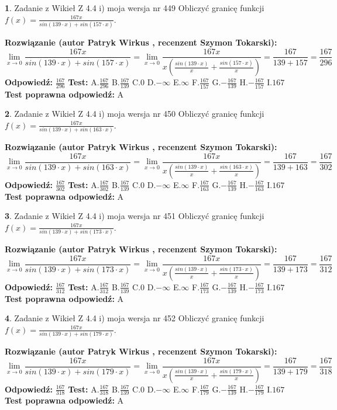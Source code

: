 \documentclass[12pt, a4paper]{article}
\theoremstyle{definition} %
\newtheorem{zad}{}
\newcommand{\zadStart}[1]{\begin{zad}#1\newline}
\newcommand{\zadStop}{\end{zad}}
\newcommand{\rozwStart}[2]{\noindent \textbf{Rozwiązanie (autor #1 , recenzent #2): }\newline}
\newcommand{\rozwStop}{\newline}
\newcommand{\odpStart}{\noindent \textbf{Odpowiedź:}\newline}
\newcommand{\odpStop}{\newline}
\newcommand{\testStart}{\noindent \textbf{Test:}\newline}
\newcommand{\testStop}{\newline}
\newcommand{\kluczStart}{\noindent \textbf{Test poprawna odpowiedź:}\newline}
\newcommand{\kluczStop}{\newline}
\begin{document}
\zadStart{Zadanie z Wikieł Z 4.4 i) moja wersja nr 449}
Obliczyć granicę funkcji $f(x)=\frac{167x}{sin(139\cdot x) +sin(157\cdot x)}$.
\zadStop
\rozwStart{Patryk Wirkus}{Szymon Tokarski}
$$\lim\limits_{x\to 0}\frac{167x}{sin(139\cdot x) +sin(157\cdot x)}=\lim\limits_{x\to 0}\frac{167x}{x(\frac{sin(139\cdot x)}{x}+\frac{sin(157\cdot x)}{x})}=\frac{167}{139+157} = \frac{167}{296}$$
\rozwStop
\odpStart
$\frac{167}{296}$
\odpStop
\testStart
A.$\frac{167}{296}$
B.$\frac{167}{139}$
C.$0$
D.$-\infty$
E.$\infty$
F.$\frac{167}{157}$
G.$-\frac{167}{139}$
H.$-\frac{167}{157}$
I.$167$
\testStop
\kluczStart
A
\kluczStop



\zadStart{Zadanie z Wikieł Z 4.4 i) moja wersja nr 450}
Obliczyć granicę funkcji $f(x)=\frac{167x}{sin(139\cdot x) +sin(163\cdot x)}$.
\zadStop
\rozwStart{Patryk Wirkus}{Szymon Tokarski}
$$\lim\limits_{x\to 0}\frac{167x}{sin(139\cdot x) +sin(163\cdot x)}=\lim\limits_{x\to 0}\frac{167x}{x(\frac{sin(139\cdot x)}{x}+\frac{sin(163\cdot x)}{x})}=\frac{167}{139+163} = \frac{167}{302}$$
\rozwStop
\odpStart
$\frac{167}{302}$
\odpStop
\testStart
A.$\frac{167}{302}$
B.$\frac{167}{139}$
C.$0$
D.$-\infty$
E.$\infty$
F.$\frac{167}{163}$
G.$-\frac{167}{139}$
H.$-\frac{167}{163}$
I.$167$
\testStop
\kluczStart
A
\kluczStop



\zadStart{Zadanie z Wikieł Z 4.4 i) moja wersja nr 451}
Obliczyć granicę funkcji $f(x)=\frac{167x}{sin(139\cdot x) +sin(173\cdot x)}$.
\zadStop
\rozwStart{Patryk Wirkus}{Szymon Tokarski}
$$\lim\limits_{x\to 0}\frac{167x}{sin(139\cdot x) +sin(173\cdot x)}=\lim\limits_{x\to 0}\frac{167x}{x(\frac{sin(139\cdot x)}{x}+\frac{sin(173\cdot x)}{x})}=\frac{167}{139+173} = \frac{167}{312}$$
\rozwStop
\odpStart
$\frac{167}{312}$
\odpStop
\testStart
A.$\frac{167}{312}$
B.$\frac{167}{139}$
C.$0$
D.$-\infty$
E.$\infty$
F.$\frac{167}{173}$
G.$-\frac{167}{139}$
H.$-\frac{167}{173}$
I.$167$
\testStop
\kluczStart
A
\kluczStop



\zadStart{Zadanie z Wikieł Z 4.4 i) moja wersja nr 452}
Obliczyć granicę funkcji $f(x)=\frac{167x}{sin(139\cdot x) +sin(179\cdot x)}$.
\zadStop
\rozwStart{Patryk Wirkus}{Szymon Tokarski}
$$\lim\limits_{x\to 0}\frac{167x}{sin(139\cdot x) +sin(179\cdot x)}=\lim\limits_{x\to 0}\frac{167x}{x(\frac{sin(139\cdot x)}{x}+\frac{sin(179\cdot x)}{x})}=\frac{167}{139+179} = \frac{167}{318}$$
\rozwStop
\odpStart
$\frac{167}{318}$
\odpStop
\testStart
A.$\frac{167}{318}$
B.$\frac{167}{139}$
C.$0$
D.$-\infty$
E.$\infty$
F.$\frac{167}{179}$
G.$-\frac{167}{139}$
H.$-\frac{167}{179}$
I.$167$
\testStop
\kluczStart
A
\kluczStop
\end{document}
